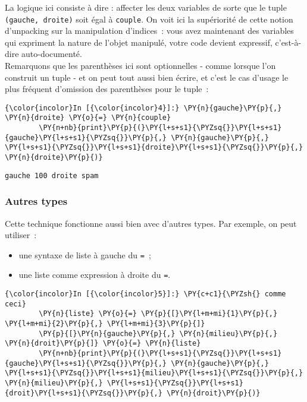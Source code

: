     La logique ici consiste à dire : affecter les deux variables de sorte
que le tuple \texttt{(gauche,\ droite)} soit égal à \texttt{couple}. On
voit ici la supériorité de cette notion d'unpacking sur la manipulation
d'indices~: vous avez maintenant des variables qui expriment la nature
de l'objet manipulé, votre code devient expressif, c'est-à-dire
auto-documenté.\\

Remarquons que les parenthèses ici sont optionnelles - comme lorsque
l'on construit un tuple - et on peut tout aussi bien écrire, et c'est le
cas d'usage le plus fréquent d'omission des parenthèses pour le tuple~:

    \begin{Verbatim}[commandchars=\\\{\}]
{\color{incolor}In [{\color{incolor}4}]:} \PY{n}{gauche}\PY{p}{,} \PY{n}{droite} \PY{o}{=} \PY{n}{couple}
        \PY{n+nb}{print}\PY{p}{(}\PY{l+s+s1}{\PYZsq{}}\PY{l+s+s1}{gauche}\PY{l+s+s1}{\PYZsq{}}\PY{p}{,} \PY{n}{gauche}\PY{p}{,} \PY{l+s+s1}{\PYZsq{}}\PY{l+s+s1}{droite}\PY{l+s+s1}{\PYZsq{}}\PY{p}{,} \PY{n}{droite}\PY{p}{)}
\end{Verbatim}


    \begin{Verbatim}[commandchars=\\\{\}]
gauche 100 droite spam

    \end{Verbatim}

    \hypertarget{autres-types}{%
\subsubsection{Autres types}\label{autres-types}}

    Cette technique fonctionne aussi bien avec d'autres types. Par exemple,
on peut utiliser~:

\begin{itemize}
\tightlist
\item
  une syntaxe de liste à gauche du \texttt{=}~;
\item
  une liste comme expression à droite du \texttt{=}.
\end{itemize}

    \begin{Verbatim}[commandchars=\\\{\}]
{\color{incolor}In [{\color{incolor}5}]:} \PY{c+c1}{\PYZsh{} comme ceci}
        \PY{n}{liste} \PY{o}{=} \PY{p}{[}\PY{l+m+mi}{1}\PY{p}{,} \PY{l+m+mi}{2}\PY{p}{,} \PY{l+m+mi}{3}\PY{p}{]}
        \PY{p}{[}\PY{n}{gauche}\PY{p}{,} \PY{n}{milieu}\PY{p}{,} \PY{n}{droit}\PY{p}{]} \PY{o}{=} \PY{n}{liste}
        \PY{n+nb}{print}\PY{p}{(}\PY{l+s+s1}{\PYZsq{}}\PY{l+s+s1}{gauche}\PY{l+s+s1}{\PYZsq{}}\PY{p}{,} \PY{n}{gauche}\PY{p}{,} \PY{l+s+s1}{\PYZsq{}}\PY{l+s+s1}{milieu}\PY{l+s+s1}{\PYZsq{}}\PY{p}{,} \PY{n}{milieu}\PY{p}{,} \PY{l+s+s1}{\PYZsq{}}\PY{l+s+s1}{droit}\PY{l+s+s1}{\PYZsq{}}\PY{p}{,} \PY{n}{droit}\PY{p}{)}
\end{Verbatim}


